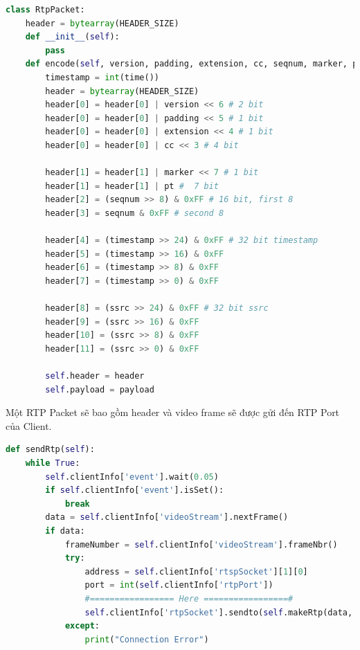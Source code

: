 \documentclass[a4paper]{article}
\begin{document}
\begin{lstlisting}[language=Python]
class RtpPacket:
    header = bytearray(HEADER_SIZE)
    def __init__(self):
        pass
    def encode(self, version, padding, extension, cc, seqnum, marker, pt, ssrc, payload):
        timestamp = int(time())
        header = bytearray(HEADER_SIZE)
        header[0] = header[0] | version << 6 # 2 bit
        header[0] = header[0] | padding << 5 # 1 bit
        header[0] = header[0] | extension << 4 # 1 bit
        header[0] = header[0] | cc << 3 # 4 bit
        
        header[1] = header[1] | marker << 7 # 1 bit
        header[1] = header[1] | pt #  7 bit
        header[2] = (seqnum >> 8) & 0xFF # 16 bit, first 8
        header[3] = seqnum & 0xFF # second 8
        
        header[4] = (timestamp >> 24) & 0xFF # 32 bit timestamp
        header[5] = (timestamp >> 16) & 0xFF
        header[6] = (timestamp >> 8) & 0xFF
        header[7] = (timestamp >> 0) & 0xFF
        
        header[8] = (ssrc >> 24) & 0xFF # 32 bit ssrc
        header[9] = (ssrc >> 16) & 0xFF
        header[10] = (ssrc >> 8) & 0xFF
        header[11] = (ssrc >> 0) & 0xFF
        
        self.header = header
        self.payload = payload
\end{lstlisting}

\noindent Một RTP Packet sẽ bao gồm header và video frame sẽ được gửi đến RTP Port của Client.

\begin{lstlisting}[language=Python]
def sendRtp(self):
    while True:
        self.clientInfo['event'].wait(0.05) 
        if self.clientInfo['event'].isSet(): 
            break 
        data = self.clientInfo['videoStream'].nextFrame()
        if data: 
            frameNumber = self.clientInfo['videoStream'].frameNbr()
            try:
                address = self.clientInfo['rtspSocket'][1][0]
                port = int(self.clientInfo['rtpPort'])
                #================= Here =================#
                self.clientInfo['rtpSocket'].sendto(self.makeRtp(data, frameNumber),(address,port))
            except:
                print("Connection Error")
\end{lstlisting}
\end{document}

